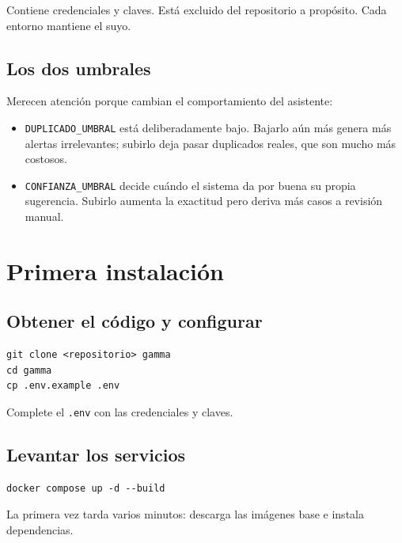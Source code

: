 \begin{aviso}
Contiene credenciales y claves. Está excluido del repositorio a propósito. Cada
entorno mantiene el suyo.
\end{aviso}

\subsection{Los dos umbrales}

Merecen atención porque cambian el comportamiento del asistente:

\begin{itemize}[leftmargin=*, itemsep=3pt]
  \item \texttt{DUPLICADO\_UMBRAL} está deliberadamente bajo. Bajarlo aún más
        genera más alertas irrelevantes; subirlo deja pasar duplicados reales,
        que son mucho más costosos.
  \item \texttt{CONFIANZA\_UMBRAL} decide cuándo el sistema da por buena su
        propia sugerencia. Subirlo aumenta la exactitud pero deriva más casos a
        revisión manual.
\end{itemize}

\newpage
\section{Primera instalación}

\subsection{Obtener el código y configurar}

\begin{verbatim}
git clone <repositorio> gamma
cd gamma
cp .env.example .env
\end{verbatim}

Complete el \texttt{.env} con las credenciales y claves.

\subsection{Levantar los servicios}

\begin{verbatim}
docker compose up -d --build
\end{verbatim}

La primera vez tarda varios minutos: descarga las imágenes base e instala
dependencias.

